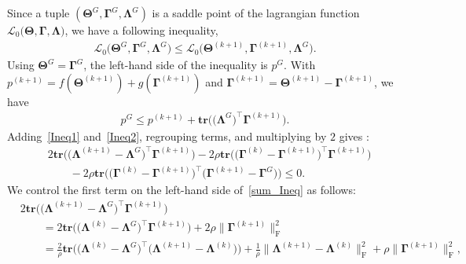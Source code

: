 \documentclass[12pt]{article}
\begin{document}
Since a tuple $(\boldsymbol{\Theta}^{G}, \boldsymbol{\Gamma}^{G}, \boldsymbol{\Lambda}^{G})$ is a saddle point of the lagrangian function $\mathcal{L}_{0}\big(\boldsymbol{\Theta},\boldsymbol{\Gamma},\boldsymbol{\Lambda} \big)$, we have a following inequality,
\begin{align*}
    \mathcal{L}_{0}\big(\boldsymbol{\Theta}^{G},\boldsymbol{\Gamma}^{G},\boldsymbol{\Lambda}^{G} \big) \leq  \mathcal{L}_{0}\big(\boldsymbol{\Theta}^{(k+1)},\boldsymbol{\Gamma}^{(k+1)},\boldsymbol{\Lambda}^{G} \big).
\end{align*}
Using $\boldsymbol{\Theta}^{G} = \boldsymbol{\Gamma}^{G}$, the left-hand side of the inequality is $p^{G}$.
With $p^{(k+1)}=f(\boldsymbol{\Theta}^{(k+1)})+g(\boldsymbol{\Gamma}^{(k+1)})$ and  $\boldsymbol{\Gamma}^{(k+1)}= \boldsymbol{\Theta}^{(k+1)}-\boldsymbol{\Gamma}^{(k+1)}$, we have
\begin{align} \label{Ineq2}
    p^{G} \leq p^{(k+1)} + \textbf{tr}\big(\big( \boldsymbol{\Lambda}^{G}\big)^{\top}\boldsymbol{\Gamma}^{(k+1)} \big).
\end{align}
Adding~\eqref{Ineq1} and~\eqref{Ineq2}, regrouping terms, and multiplying by $2$ gives :
\begin{align} \label{sum_Ineq}
    &2\textbf{tr}\big( \big( \boldsymbol{\Lambda}^{(k+1)} - \boldsymbol{\Lambda}^{G} \big)^{\top}\boldsymbol{\Gamma}^{(k+1)} \big)
    -2 \rho \textbf{tr}\big( \big( \boldsymbol{\Gamma}^{(k)} - \boldsymbol{\Gamma}^{(k+1)} \big)^{\top}\boldsymbol{\Gamma}^{(k+1)} \big) \nonumber \\
    &\qquad -2\rho \textbf{tr}\big( \big( \boldsymbol{\Gamma}^{(k)} - \boldsymbol{\Gamma}^{(k+1)} \big)^{\top}\big( 
    \boldsymbol{\Gamma}^{(k+1)}-\boldsymbol{\Gamma}^{G}\big) \big) \leq 0.
\end{align}
We control the first term on the left-hand side of~\eqref{sum_Ineq} as follows: 
\begin{align}
    &2\textbf{tr}\big( \big( \boldsymbol{\Lambda}^{(k+1)} - \boldsymbol{\Lambda}^{G} \big)^{\top}\boldsymbol{\Gamma}^{(k+1)} \big) \nonumber \\
    &\qquad= 2\textbf{tr}\big( \big( \boldsymbol{\Lambda}^{(k)} - \boldsymbol{\Lambda}^{G} \big)^{\top}\boldsymbol{\Gamma}^{(k+1)} \big)
    + 2\rho \| \boldsymbol{\Gamma}^{(k+1)} \|_{\text{F}}^{2} \nonumber \\
    &\qquad = \frac{2}{\rho}\textbf{tr}\big( \big( \boldsymbol{\Lambda}^{(k)} - \boldsymbol{\Lambda}^{G} \big)^{\top}\big( \boldsymbol{\Lambda}^{(k+1)} - \boldsymbol{\Lambda}^{(k)} \big) \big) + \frac{1}{\rho} \| \boldsymbol{\Lambda}^{(k+1)} - \boldsymbol{\Lambda}^{(k)} \|_{\text{F}}^{2} 
    + \rho \| \boldsymbol{\Gamma}^{(k+1)} \|_{\text{F}}^{2}, \label{firsterm}
\end{align}
\end{document}
